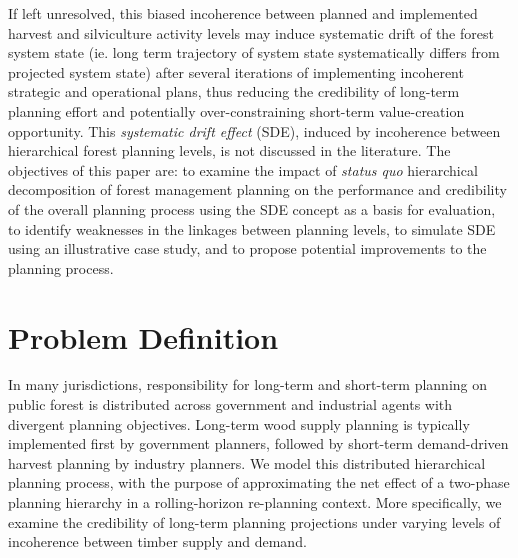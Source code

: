 If left unresolved, this biased incoherence between planned and
implemented harvest and silviculture activity levels may induce
systematic drift of the forest system state (ie. long term trajectory
of system state systematically differs from projected system state)
after several iterations of implementing incoherent strategic and
operational plans, thus reducing the credibility of long-term planning
effort and potentially over-constraining short-term value-creation
opportunity. This \emph{systematic drift effect} (SDE), induced by
incoherence between hierarchical forest planning levels, is not
discussed in the literature. The objectives of this paper are: to
examine the impact of \emph{status quo} hierarchical decomposition of
forest management planning on the performance and credibility of the
overall planning process using the SDE concept as a basis for
evaluation, to identify weaknesses in the linkages between planning
levels, to simulate SDE using an illustrative case study, and to
propose potential improvements to the planning process.


\section{Problem Definition}
\label{sec:problem}

In many jurisdictions, responsibility for long-term and short-term
planning on public forest is distributed across government and
industrial agents with divergent planning objectives. Long-term wood
supply planning is typically implemented first by government planners,
followed by short-term demand-driven harvest planning by industry
planners. We model this distributed hierarchical
planning process, with the purpose of approximating the net effect of a
two-phase planning hierarchy in a rolling-horizon re-planning
context. More specifically, we examine the credibility of long-term
planning projections under varying levels of incoherence between
timber supply and demand.

